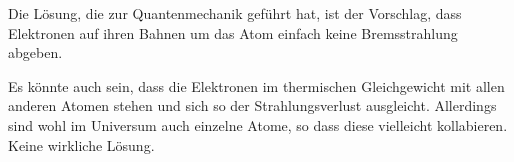 Die Lösung, die zur Quantenmechanik geführt hat, ist der Vorschlag, dass
Elektronen auf ihren Bahnen um das Atom einfach keine Bremsstrahlung abgeben.

Es könnte auch sein, dass die Elektronen im thermischen Gleichgewicht mit allen
anderen Atomen stehen und sich so der Strahlungsverlust ausgleicht. Allerdings
sind wohl im Universum auch einzelne Atome, so dass diese vielleicht
kollabieren. Keine wirkliche Lösung.


\IfFileExists{\bibliographyfile}{
}{}



